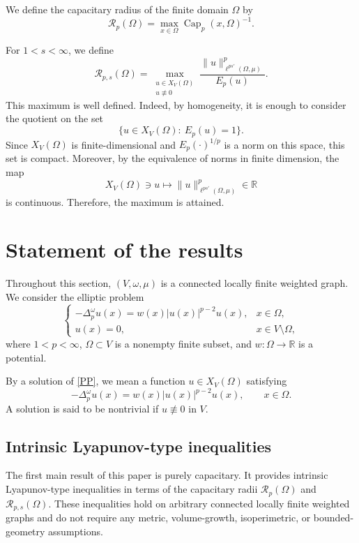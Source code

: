 \documentclass[twoside,12pt,letter]{article}
\theoremstyle{plain}
\theoremstyle{definition}
\theoremstyle{remark}
\numberwithin{equation}{section}
\begin{document}
We define the capacitary radius of the finite domain \(\Omega\) by
\[
\mathcal{R}_p(\Omega)
=
\max_{x\in\Omega}\operatorname{Cap}_p(x,\Omega)^{-1}.
\]

For \(1<s<\infty\), we define
\[
\mathcal{R}_{p,s}(\Omega)
=
\max_{\substack{u\in X_V(\Omega)\\ u\not\equiv 0}}
\frac{\|u\|_{\ell^{ps'}(\Omega,\mu)}^p}{E_p(u)}.
\]
This maximum is well defined. Indeed, by homogeneity, it is enough to consider
the quotient on the set
\[
\{u\in X_V(\Omega):\ E_p(u)=1\}.
\]
Since \(X_V(\Omega)\) is finite-dimensional and \(E_p(\cdot)^{1/p}\) is a norm
on this space, this set is compact. Moreover, by the equivalence of norms in
finite dimension, the map
\[
X_V(\Omega)\ni u\mapsto \|u\|_{\ell^{ps'}(\Omega,\mu)}^p\in\mathbb{R}
\]
is continuous. Therefore, the maximum is attained.

\section{Statement of the results}\label{sec3}

Throughout this section, \((V,\omega,\mu)\) is a connected locally finite
weighted graph. We consider the elliptic problem
\begin{equation}\label{PP}
\left\{
\begin{array}{ll}
-\Delta_p^\omega u(x)=w(x)|u(x)|^{p-2}u(x), & x\in \Omega,\\[6pt]
u(x)=0, & x\in V\setminus\Omega,
\end{array}
\right.
\end{equation}
where \(1<p<\infty\), \(\Omega\subset V\) is a nonempty finite subset, and
\(w:\Omega\to\mathbb{R}\) is a potential.

By a solution of \eqref{PP}, we mean a function \(u\in X_V(\Omega)\) satisfying
\[
-\Delta_p^\omega u(x)=w(x)|u(x)|^{p-2}u(x),
\qquad x\in\Omega.
\]
A solution is said to be nontrivial if \(u\not\equiv 0\) in \(V\).

\subsection{Intrinsic Lyapunov-type inequalities}

The first main result of this paper is purely capacitary. It provides
intrinsic Lyapunov-type inequalities in terms of the capacitary radii
\(\mathcal{R}_p(\Omega)\) and \(\mathcal{R}_{p,s}(\Omega)\). These inequalities
hold on arbitrary connected locally finite weighted graphs and do not require
any metric, volume-growth, isoperimetric, or bounded-geometry assumptions.
\end{document}

